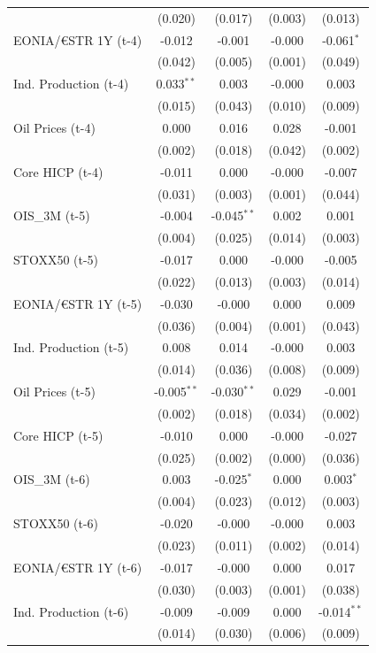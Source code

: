 \begin{longtable}[t]{lcccc}
 & (0.020) & (0.017) & (0.003) & (0.013)\\
EONIA/€STR 1Y (t-4) & -0.012 & -0.001 & -0.000 & -0.061$^{*}$\\
 & (0.042) & (0.005) & (0.001) & (0.049)\\
Ind. Production (t-4) & 0.033$^{**}$ & 0.003 & -0.000 & 0.003\\
 & (0.015) & (0.043) & (0.010) & (0.009)\\
Oil Prices (t-4) & 0.000 & 0.016 & 0.028 & -0.001\\
 & (0.002) & (0.018) & (0.042) & (0.002)\\
Core HICP (t-4) & -0.011 & 0.000 & -0.000 & -0.007\\
 & (0.031) & (0.003) & (0.001) & (0.044)\\
OIS\_3M (t-5) & -0.004 & -0.045$^{**}$ & 0.002 & 0.001\\
 & (0.004) & (0.025) & (0.014) & (0.003)\\
STOXX50 (t-5) & -0.017 & 0.000 & -0.000 & -0.005\\
 & (0.022) & (0.013) & (0.003) & (0.014)\\
EONIA/€STR 1Y (t-5) & -0.030 & -0.000 & 0.000 & 0.009\\
 & (0.036) & (0.004) & (0.001) & (0.043)\\
Ind. Production (t-5) & 0.008 & 0.014 & -0.000 & 0.003\\
 & (0.014) & (0.036) & (0.008) & (0.009)\\
Oil Prices (t-5) & -0.005$^{**}$ & -0.030$^{**}$ & 0.029 & -0.001\\
 & (0.002) & (0.018) & (0.034) & (0.002)\\
Core HICP (t-5) & -0.010 & 0.000 & -0.000 & -0.027\\
 & (0.025) & (0.002) & (0.000) & (0.036)\\
OIS\_3M (t-6) & 0.003 & -0.025$^{*}$ & 0.000 & 0.003$^{*}$\\
 & (0.004) & (0.023) & (0.012) & (0.003)\\
STOXX50 (t-6) & -0.020 & -0.000 & -0.000 & 0.003\\
 & (0.023) & (0.011) & (0.002) & (0.014)\\
EONIA/€STR 1Y (t-6) & -0.017 & -0.000 & 0.000 & 0.017\\
 & (0.030) & (0.003) & (0.001) & (0.038)\\
Ind. Production (t-6) & -0.009 & -0.009 & 0.000 & -0.014$^{**}$\\
 & (0.014) & (0.030) & (0.006) & (0.009)\\

\end{longtable}
